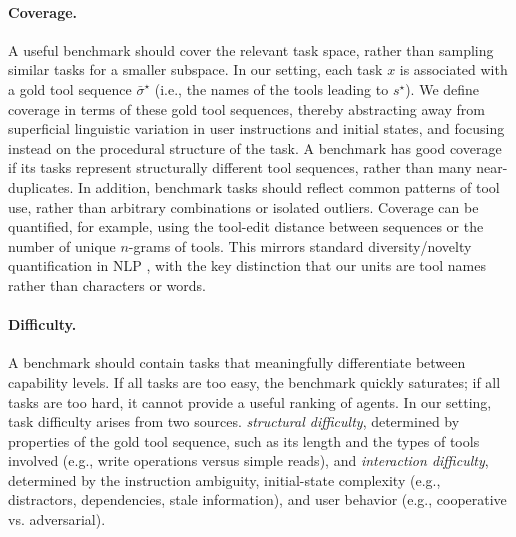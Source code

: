 \paragraph{Coverage.}
A useful benchmark should cover the relevant task space, rather than sampling similar tasks for a smaller subspace. In our setting, each task $x$ is associated with a gold tool sequence $\bar\sigma^\star$ (i.e., the names of the tools leading to $s^\star$). We define coverage in terms of these gold tool sequences, thereby abstracting away from superficial linguistic variation in user instructions and initial states, and focusing instead on the procedural structure of the task. A benchmark has good coverage if its tasks represent structurally different tool sequences, rather than many near-duplicates. In addition, benchmark tasks should reflect common patterns of tool use, rather than arbitrary combinations or isolated outliers. Coverage can be quantified, for example, using the tool-edit distance between sequences or the number of unique $n$-grams of tools. This mirrors standard diversity/novelty quantification in NLP \citep{raven2023mccoy}, with the key distinction that our units are tool names rather than characters or words.

\paragraph{Difficulty.}
A benchmark should contain tasks that meaningfully differentiate between capability levels. If all tasks are too easy, the benchmark quickly saturates; if all tasks are too hard, it cannot provide a useful ranking of agents. In our setting, task difficulty arises from two sources. \emph{structural difficulty}, determined by properties of the gold tool sequence, such as its length and the types of tools involved (e.g., write operations versus simple reads), and \emph{interaction difficulty}, determined by the instruction ambiguity, initial-state complexity (e.g., distractors, dependencies, stale information), and user behavior (e.g., cooperative vs. adversarial).
